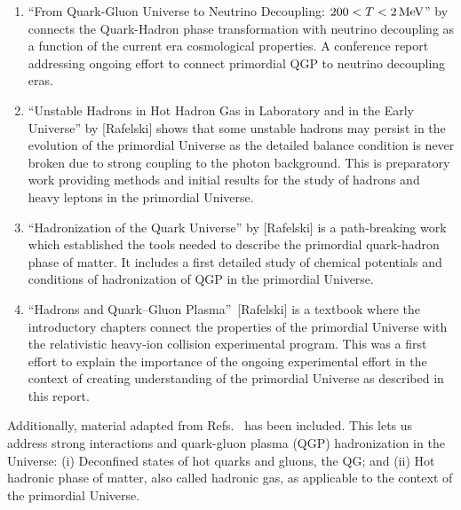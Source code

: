 \begin{enumerate}
%
\item ``From Quark-Gluon Universe to Neutrino Decoupling: $200 < T < 2\text{\,MeV}$'' by  {\color{black} connects the Quark-Hadron phase transformation with neutrino decoupling as a function of the current era cosmological properties. A conference report addressing ongoing effort to connect primordial QGP to neutrino decoupling eras.}
%
\item ``Unstable Hadrons in Hot Hadron Gas in Laboratory and in the Early Universe'' by [Rafelski] shows that some unstable hadrons may persist in the evolution of the primordial Universe as the detailed balance condition is never broken due to strong coupling to the photon background. {\color{black} This is preparatory work providing methods and initial results for the study of hadrons and heavy leptons in the primordial Universe.}
%
\item ``Hadronization of the Quark Universe'' by [Rafelski] is {\color{black} a path-breaking work which established the tools needed to describe the primordial quark-hadron phase of matter.} It includes a first detailed study of chemical potentials and conditions of hadronization of QGP in the primordial Universe. 
%
\item {\color{black}``Hadrons and Quark–Gluon Plasma''~[Rafelski] is a textbook where the introductory chapters connect the properties of the primordial Universe with the relativistic heavy-ion collision experimental program. This was a first effort to explain the importance of the ongoing experimental effort in the context of creating understanding of the primordial Universe as described in this report.}
\end{enumerate}
Additionally, material adapted from Refs.~\cite{Rafelski:2019twp,Rafelski:2016hnq,Rafelski:2015cxa} has been included. This lets us address strong interactions and quark-gluon plasma (QGP) hadronization in the Universe: (i) Deconfined states of hot quarks and gluons, the QG; and (ii) Hot hadronic phase of matter, also called hadronic gas, as applicable to the context of the primordial Universe. 
